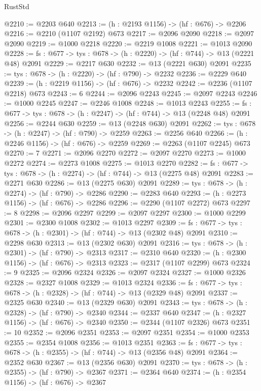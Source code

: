 \begin{lexlean}{RustStd}
\begin{coremodule}
@2210 := @2203 @640
@2213 := (h : @2193 @1156) -> (hf : @676) -> @2206
@2216 := @2210 (@1107 @2192) @673
@2217 := @2096 @2090
@2218 := @2097 @2090
@2219 := @1000 @2218
@2220 := @2219 @1008
@2221 := @1013 @2090
@2228 := {fs : @677} -> {tys : @678} -> (h : @2220) -> (hf : @744) -> @13 (@2221 @48) @2091
@2229 := @2217 @630
@2232 := @13 (@2221 @630) @2091
@2235 := {tys : @678} -> (h : @2220) -> (hf : @790) -> @2232
@2236 := @2229 @640
@2239 := (h : @2219 @1156) -> (hf : @676) -> @2232
@2242 := @2236 (@1107 @2218) @673
@2243 := 6
@2244 := @2096 @2243
@2245 := @2097 @2243
@2246 := @1000 @2245
@2247 := @2246 @1008
@2248 := @1013 @2243
@2255 := {fs : @677} -> {tys : @678} -> (h : @2247) -> (hf : @744) -> @13 (@2248 @48) @2091
@2256 := @2244 @630
@2259 := @13 (@2248 @630) @2091
@2262 := {tys : @678} -> (h : @2247) -> (hf : @790) -> @2259
@2263 := @2256 @640
@2266 := (h : @2246 @1156) -> (hf : @676) -> @2259
@2269 := @2263 (@1107 @2245) @673
@2270 := 7
@2271 := @2096 @2270
@2272 := @2097 @2270
@2273 := @1000 @2272
@2274 := @2273 @1008
@2275 := @1013 @2270
@2282 := {fs : @677} -> {tys : @678} -> (h : @2274) -> (hf : @744) -> @13 (@2275 @48) @2091
@2283 := @2271 @630
@2286 := @13 (@2275 @630) @2091
@2289 := {tys : @678} -> (h : @2274) -> (hf : @790) -> @2286
@2290 := @2283 @640
@2293 := (h : @2273 @1156) -> (hf : @676) -> @2286
@2296 := @2290 (@1107 @2272) @673
@2297 := 8
@2298 := @2096 @2297
@2299 := @2097 @2297
@2300 := @1000 @2299
@2301 := @2300 @1008
@2302 := @1013 @2297
@2309 := {fs : @677} -> {tys : @678} -> (h : @2301) -> (hf : @744) -> @13 (@2302 @48) @2091
@2310 := @2298 @630
@2313 := @13 (@2302 @630) @2091
@2316 := {tys : @678} -> (h : @2301) -> (hf : @790) -> @2313
@2317 := @2310 @640
@2320 := (h : @2300 @1156) -> (hf : @676) -> @2313
@2323 := @2317 (@1107 @2299) @673
@2324 := 9
@2325 := @2096 @2324
@2326 := @2097 @2324
@2327 := @1000 @2326
@2328 := @2327 @1008
@2329 := @1013 @2324
@2336 := {fs : @677} -> {tys : @678} -> (h : @2328) -> (hf : @744) -> @13 (@2329 @48) @2091
@2337 := @2325 @630
@2340 := @13 (@2329 @630) @2091
@2343 := {tys : @678} -> (h : @2328) -> (hf : @790) -> @2340
@2344 := @2337 @640
@2347 := (h : @2327 @1156) -> (hf : @676) -> @2340
@2350 := @2344 (@1107 @2326) @673
@2351 := 10
@2352 := @2096 @2351
@2353 := @2097 @2351
@2354 := @1000 @2353
@2355 := @2354 @1008
@2356 := @1013 @2351
@2363 := {fs : @677} -> {tys : @678} -> (h : @2355) -> (hf : @744) -> @13 (@2356 @48) @2091
@2364 := @2352 @630
@2367 := @13 (@2356 @630) @2091
@2370 := {tys : @678} -> (h : @2355) -> (hf : @790) -> @2367
@2371 := @2364 @640
@2374 := (h : @2354 @1156) -> (hf : @676) -> @2367

\end{coremodule}
\end{lexlean}
